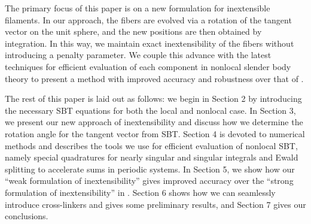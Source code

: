 The primary focus of this paper is on a new formulation for inextensible filaments. In our approach, the fibers are evolved via a rotation of the tangent vector on the unit sphere, and the new positions are then obtained by integration. In this way, we maintain exact inextensibility of the fibers without introducing a penalty parameter. We couple this advance with the latest techniques \cite{barLud, tornquad} for efficient evaluation of each component in nonlocal slender body theory to present a method with improved accuracy and robustness over that of \cite{ehssan17}. 

The rest of this paper is laid out as follows: we begin in Section 2 by introducing the necessary SBT equations for both the local and nonlocal case. In Section 3, we present our new approach of inextensibility and discuss how we determine the rotation angle for the tangent vector from SBT. Section 4 is devoted to numerical methods and describes the tools we use for efficient evaluation of nonlocal SBT, namely special quadratures for nearly singular and singular integrals and Ewald splitting to accelerate sums in periodic systems. In Section 5, we show how our ``weak formulation of inextensibility'' gives improved accuracy over the ``strong formulation of inextensibility'' in \cite{ts04, ehssan17}. Section 6 shows how we can seamlessly introduce cross-linkers and gives some preliminary results, and Section 7 gives our conclusions. 